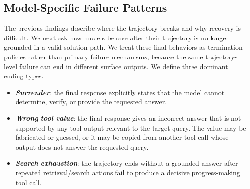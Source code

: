 \subsection{Model-Specific Failure Patterns}
\label{sec:error-modelwise}




The previous findings describe where the trajectory breaks and why recovery is difficult.
We next ask how models behave after their trajectory is no longer grounded in a valid solution path.
We treat these final behaviors as termination policies rather than primary failure mechanisms, because the same trajectory-level failure can end in different surface outputs.
We define three dominant ending types:
\begin{itemize}[topsep=2pt, partopsep=3pt, leftmargin=*, itemsep=-3pt]
\item \textbf{\textit{Surrender}}: the final response explicitly states that the model cannot determine, verify, or provide the requested answer.
\item \textbf{\textit{Wrong tool value}}: the final response gives an incorrect answer that is not supported by any tool output relevant to the target query. The value may be fabricated or guessed, or it may be copied from another tool call whose output does not answer the requested query.
\item \textbf{\textit{Search exhaustion}}: the trajectory ends without a grounded answer after repeated retrieval/search actions fail to produce a decisive progress-making tool call.
\end{itemize}

